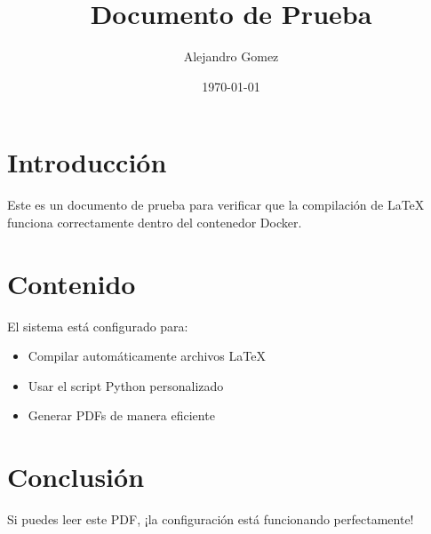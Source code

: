 \documentclass{article}
\title{Documento de Prueba}
\author{Alejandro Gomez}
\date{\today}
\begin{document}
\maketitle

\section{Introducción}

Este es un documento de prueba para verificar que la compilación de LaTeX funciona correctamente dentro del contenedor Docker.

\section{Contenido}

El sistema está configurado para:
\begin{itemize}
    \item Compilar automáticamente archivos LaTeX
    \item Usar el script Python personalizado
    \item Generar PDFs de manera eficiente
\end{itemize}

\section{Conclusión}

Si puedes leer este PDF, ¡la configuración está funcionando perfectamente!
\end{document}
